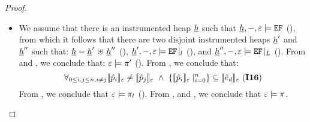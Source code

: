 \begin{proof}
\begin{itemize}
	\item {} We assume that there is an instrumented heap $\underline{h}$ such that 
	         $\underline{h}, -, \varepsilon \models \mathtt{EF}$ (), from which it follows that there are two 
	         disjoint instrumented heaps $\underline{h}'$ and $\underline{h}''$ such that: 
		$\underline{h} = \underline{h}' \, \uplus \, \underline{h}''$ (), $\underline{h}', -, \varepsilon \models \mathtt{EF}\!\mid_{l}$ (), 
		and $\underline{h}'', -, \varepsilon \models \mathtt{EF}\!\mid_{L}$ (). 
		From  and , we conclude that:  $ \varepsilon \models \pi'$ (). 
		From , we conclude that: 
		$$
		   \forall_{0 \leq i, j \leq n, i \neq j} \llbracket \hat{p}_i \rrbracket_{\varepsilon} \neq \llbracket \hat{p}_j \rrbracket_{\varepsilon} \ \wedge \
		         \{ \llbracket \hat{p}_i \rrbracket_{\varepsilon} \mid_{i=0}^n \} \subseteq \llbracket \hat{e}_d \rrbracket_{\varepsilon} \text{ ({\bf I16})}
  		$$
		From , we conclude that $\varepsilon \models \pi_{l}$ (). From ,  and , 
		we conclude that $\varepsilon \models \pi$. 
\end{itemize}


\end{proof}


